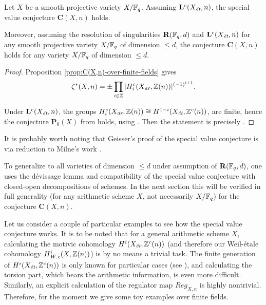 \documentclass{article}
\numberwithin{equation}{section}
\begin{document}
\begin{theorem}
  \label{thm:C(X,n)-over-finite-fields}
  Let $X$ be a smooth projective variety $X/\FF_q$. Assuming
  $\mathbf{L}^c (X_\et,n)$, the special value conjecture
  $\mathbf{C} (X,n)$ holds.

  Moreover, assuming the resolution of singularities $\mathbf{R} (\FF_q,d)$ and
  $\mathbf{L}^c (X_\et,n)$ for any smooth projective variety $X/\FF_q$ of
  dimension $\le d$, the conjecture $\mathbf{C} (X,n)$ holds for any variety
  $X/\FF_q$ of dimension $\le d$.

  \begin{proof}
    Proposition \ref{prop:C(X,n)-over-finite-fields} gives
    \[ \zeta^* (X,n) =
      \pm \prod_{i \in \ZZ} |H_i^c (X_\ar, \ZZ (n))|^{(-1)^{i+1}}. \]

    Under $\mathbf{L}^c (X_\et,n)$, the groups
    $H_i^c (X_\ar, \ZZ(n)) \cong H^{1-i} (X_\et, \ZZ^c (n))$, are finite, hence
    the conjecture $\mathbf{P}_0 (X)$ from
    \cite[\S 4]{Geisser-2010-arithmetic-homology} holds, using
    \cite[Proposition~4.1]{Geisser-2010-arithmetic-homology}.  Then the
    statement is precisely \cite[Theorem~4.5]{Geisser-2010-arithmetic-homology}.
  \end{proof}
\end{theorem}

\begin{remark}
  It is probably worth noting that Geisser's proof of the special value
  conjecture is via reduction to Milne's work \cite{Milne-1986}.

  To generalize to all varieties of dimension $\le d$ under assumption of
  $\mathbf{R} (\FF_q,d)$, one uses the dévissage lemma
  \cite[Lemma~2.7]{Geisser-2006} and compatibility of the special value
  conjecture with closed-open decompositions of schemes. In the next section
  this will be verified in full generality (for any arithmetic scheme $X$, not
  necessarily $X/\FF_q$) for the conjecture $\mathbf{C} (X,n)$.
\end{remark}

Let us consider a couple of particular examples to see how the special value
conjecture works. It is to be noted that for a general arithmetic scheme $X$,
calculating the motivic cohomology $H^i (X_\et, \ZZ^c (n))$ (and therefore our
Weil-étale cohomology $H^i_\Wc (X, \ZZ(n))$) is by no means a trivial task. The
finite generation of $H^i (X_\et, \ZZ^c (n))$ is only known for particular cases
(see \cite[\S 8]{Beshenov-Weil-etale-1}), and calculating the torsion part,
which bears the arithmetic information, is even more difficult. Similarly, an
explicit calculation of the regulator map $Reg_{X,n}$ is highly
nontrivial. Therefore, for the moment we give some toy examples over finite
fields.
\end{document}
